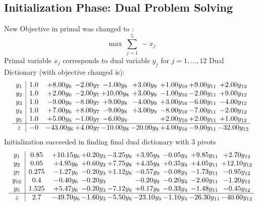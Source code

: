 \documentclass[8pt]{article}
\begin{document}
\subsection{Initialization Phase: Dual Problem Solving}
New Objective in primal was changed to : \[ \max\ \sum_{j=1}^{5}\ - x_j \] 
Primal variable $x_j$ corresponds to dual variable $y_j$ for $j = 1,\ldots,12$
Dual Dictionary (with objective changed is): 
\[\begin{array}{c| c c@{\hskip 2pt} c@{\hskip 2pt} c@{\hskip 2pt} c@{\hskip 2pt} c@{\hskip 2pt} c@{\hskip 2pt} c@{\hskip 2pt} }
 y_{1}   &  1.0 & +  8.00 y_{6} & -2.00 y_{7} & -1.00 y_{8} & +  3.00 y_{9} & +  1.00 y_{10} & +  9.00 y_{11} & +  2.00 y_{12}\\
 y_{2}   &  1.0 & +  2.00 y_{6} & -2.00 y_{7} & + 10.00 y_{8} & +  3.00 y_{9} & -1.00 y_{10} & -2.00 y_{11} & +  9.00 y_{12}\\
 y_{3}   &  1.0 & -9.00 y_{6} & -8.00 y_{7} & +  9.00 y_{8} & -4.00 y_{9} & +  3.00 y_{10} & -6.00 y_{11} & -4.00 y_{12}\\
 y_{4}   &  1.0 & +  7.00 y_{6} & +  8.00 y_{7} & -9.00 y_{8} & +  3.00 y_{9} & -8.00 y_{10} & -7.00 y_{11} & -2.00 y_{12}\\
 y_{5}   &  1.0 & +  5.00 y_{6} & -1.00 y_{7} & -6.00 y_{8} &   & +  2.00 y_{10} & +  2.00 y_{11} & +  1.00 y_{12}\\
\hline
z    &  -0 & -43.00 y_{6} & +  4.00 y_{7} & -10.00 y_{8} & -20.00 y_{9} & +  4.00 y_{10} & -9.00 y_{11} & -32.00 y_{12}\\
\end{array}\]
Initialization succeeded in finding final dual dictionary with 3 pivots
\[\begin{array}{c| c c@{\hskip 2pt} c@{\hskip 2pt} c@{\hskip 2pt} c@{\hskip 2pt} c@{\hskip 2pt} c@{\hskip 2pt} c@{\hskip 2pt} }
 y_{1}   &  0.85 & + 10.15 y_{6} & +  0.20 y_{3} & -3.25 y_{8} & +  3.95 y_{9} & -0.05 y_{4} & +  9.85 y_{11} & +  2.70 y_{12}\\
 y_{2}   &  0.05 & +  4.95 y_{6} & +  0.60 y_{3} & +  7.75 y_{8} & +  4.35 y_{9} & +  0.35 y_{4} & +  4.05 y_{11} & + 12.10 y_{12}\\
 y_{7}   &  0.275 & -1.27 y_{6} & -0.20 y_{3} & +  1.12 y_{8} & -0.57 y_{9} & -0.08 y_{4} & -1.73 y_{11} & -0.95 y_{12}\\
 y_{10}   &  0.4 & -0.40 y_{6} & -0.20 y_{3} &   & -0.20 y_{9} & -0.20 y_{4} & -2.60 y_{11} & -1.20 y_{12}\\
 y_{5}   &  1.525 & +  5.47 y_{6} & -0.20 y_{3} & -7.12 y_{8} & +  0.17 y_{9} & -0.33 y_{4} & -1.48 y_{11} & -0.45 y_{12}\\
\hline
z    &  2.7 & -49.70 y_{6} & -1.60 y_{3} & -5.50 y_{8} & -23.10 y_{9} & -1.10 y_{4} & -26.30 y_{11} & -40.60 y_{12}\\
\end{array}\]
\end{document}
